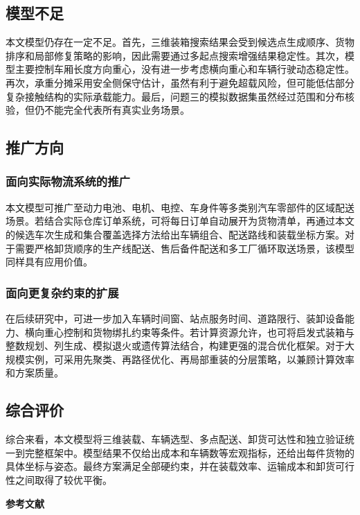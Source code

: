 ﻿\documentclass[UTF8,a4paper,12pt]{ctexart}
\newcommand{\paperbold}{\CJKfontspec[AutoFakeBold=4]{SimSun}\bfseries}
\begin{document}
	\subsection{模型不足}
	
	本文模型仍存在一定不足。首先，三维装箱搜索结果会受到候选点生成顺序、货物排序和局部修复策略的影响，因此需要通过多起点搜索增强结果稳定性。其次，模型主要控制车厢长度方向重心，没有进一步考虑横向重心和车辆行驶动态稳定性。再次，承重分摊采用安全侧保守估计，虽然有利于避免超载风险，但可能低估部分复杂接触结构的实际承载能力。最后，问题三的模拟数据集虽然经过范围和分布核验，但仍不能完全代表所有真实业务场景。
	
	\subsection{推广方向}
	
	\subsubsection{面向实际物流系统的推广}
	
	本文模型可推广至动力电池、电机、电控、车身件等多类别汽车零部件的区域配送场景。若结合实际仓库订单系统，可将每日订单自动展开为货物清单，再通过本文的候选车次生成和集合覆盖选择方法给出车辆组合、配送路线和装载坐标方案。对于需要严格卸货顺序的生产线配送、售后备件配送和多工厂循环取送场景，该模型同样具有应用价值。
	
	\subsubsection{面向更复杂约束的扩展}
	
	在后续研究中，可进一步加入车辆时间窗、站点服务时间、道路限行、装卸设备能力、横向重心控制和货物绑扎约束等条件。若计算资源允许，也可将启发式装箱与整数规划、列生成、模拟退火或遗传算法结合，构建更强的混合优化框架。对于大规模实例，可采用先聚类、再路径优化、再局部重装的分层策略，以兼顾计算效率和方案质量。
	
	\subsection{综合评价}
	
	综合来看，本文模型将三维装载、车辆选型、多点配送、卸货可达性和独立验证统一到完整框架中。模型结果不仅给出成本和车辆数等宏观指标，还给出每件货物的具体坐标与姿态。最终方案满足全部硬约束，并在装载效率、运输成本和卸货可行性之间取得了较优平衡。
	
	\newpage
	\begin{center}
		{\paperbold{} 参考文献}
	\end{center}
	
\end{document}
